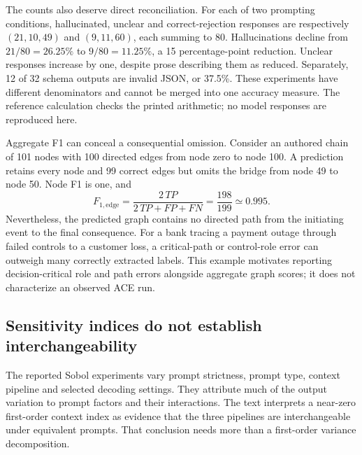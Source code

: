 The counts also deserve direct reconciliation. For each of two prompting conditions, hallucinated, unclear and correct-rejection responses are respectively $(21,10,49)$ and $(9,11,60)$, each summing to 80. Hallucinations decline from $21/80=26.25\%$ to $9/80=11.25\%$, a 15 percentage-point reduction. Unclear responses increase by one, despite prose describing them as reduced. Separately, 12 of 32 schema outputs are invalid JSON, or 37.5\%. These experiments have different denominators and cannot be merged into one accuracy measure. The reference calculation checks the printed arithmetic; no model responses are reproduced here.\citep{exec21_ace,exec21_ace_reference}

Aggregate F1 can conceal a consequential omission. Consider an authored chain of 101 nodes with 100 directed edges from node zero to node 100. A prediction retains every node and 99 correct edges but omits the bridge from node 49 to node 50. Node F1 is one, and
\begin{equation}
 F_{1,\mathrm{edge}}=\frac{2\,TP}{2\,TP+FP+FN}
 =\frac{198}{199}\simeq0.995.
 \label{exec21:ace-path}
\end{equation}
Nevertheless, the predicted graph contains no directed path from the initiating event to the final consequence. For a bank tracing a payment outage through failed controls to a customer loss, a critical-path or control-role error can outweigh many correctly extracted labels. This example motivates reporting decision-critical role and path errors alongside aggregate graph scores; it does not characterize an observed ACE run.\citep{exec21_ace_reference}

\subsection{Sensitivity indices do not establish interchangeability}
\label{exec21:ace-sensitivity}
The reported Sobol experiments vary prompt strictness, prompt type, context pipeline and selected decoding settings. They attribute much of the output variation to prompt factors and their interactions. The text interprets a near-zero first-order context index as evidence that the three pipelines are interchangeable under equivalent prompts. That conclusion needs more than a first-order variance decomposition.\citep{exec21_ace}

